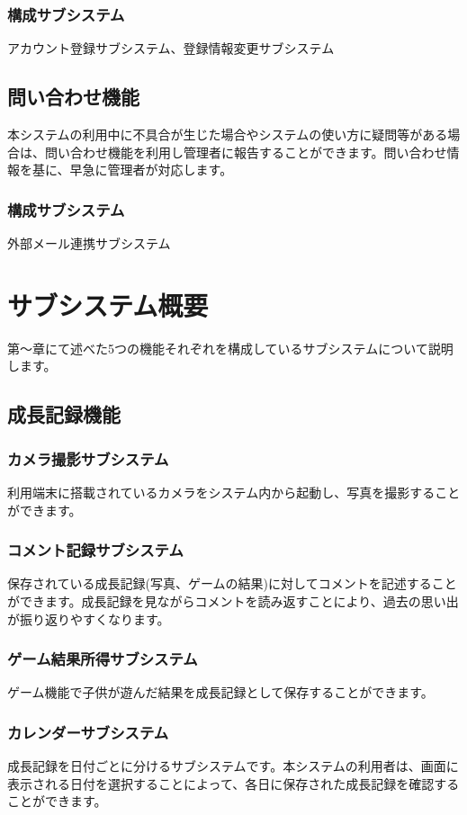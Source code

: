 \documentclass[a4j]{jarticle}
\begin{document}
\subsubsection*{構成サブシステム} 
\noindent アカウント登録サブシステム、登録情報変更サブシステム

\subsection{問い合わせ機能} 
本システムの利用中に不具合が生じた場合やシステムの使い方に疑問等がある場合は、問い合わせ機能を利用し管理者に報告することができます。問い合わせ情報を基に、早急に管理者が対応します。 
\subsubsection*{構成サブシステム} 
\noindent 外部メール連携サブシステム 


\section{サブシステム概要} 
第〜章にて述べた5つの機能それぞれを構成しているサブシステムについて説明します。 

\subsection{成長記録機能} 
\subsubsection*{カメラ撮影サブシステム} 
利用端末に搭載されているカメラをシステム内から起動し、写真を撮影することができます。 
\subsubsection*{コメント記録サブシステム} 
保存されている成長記録(写真、ゲームの結果)に対してコメントを記述することができます。成長記録を見ながらコメントを読み返すことにより、過去の思い出が振り返りやすくなります。 
\subsubsection*{ゲーム結果所得サブシステム} 
ゲーム機能で子供が遊んだ結果を成長記録として保存することができます。 
\subsubsection*{カレンダーサブシステム} 
成長記録を日付ごとに分けるサブシステムです。本システムの利用者は、画面に表示される日付を選択することによって、各日に保存された成長記録を確認することができます。 
\end{document}
